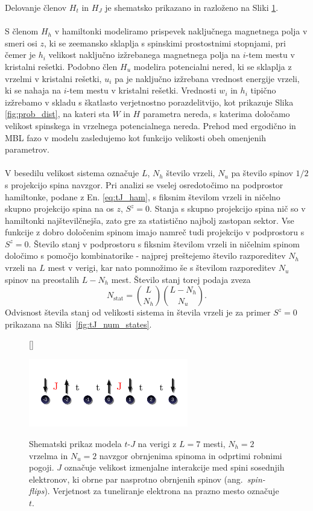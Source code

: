 Delovanje členov $H_t$ in $H_J$ je shematsko prikazano in razloženo na Sliki \ref{fig:tJ_scheme}. \\\\
S členom $H_h$ v hamiltonki modeliramo prispevek naključnega magnetnega polja v smeri osi $z$, ki se zeemansko sklaplja s 
spinskimi prostostnimi stopnjami, pri čemer je $h_i$ velikost naključno izžrebanega magnetnega polja na $i$-tem mestu v kristalni rešetki. Podobno člen $H_u$ modelira potencialni nered, ki se sklaplja z vrzelmi v kristalni rešetki, $u_i$ pa je naključno izžrebana vrednost energije vrzeli, ki se nahaja na $i$-tem mestu v kristalni rešetki. Vrednosti $w_i$ in $h_i$ tipično izžrebamo v skladu s škatlasto verjetnostno porazdelitvijo, kot prikazuje Slika \ref{fig:prob_dist}, na kateri sta $W$ in $H$	 parametra 
nereda, s katerima določamo velikost spinskega in vrzelnega potencialnega nereda. Prehod med ergodično in MBL fazo
v modelu zasledujemo kot funkcijo velikosti obeh omenjenih parametrov.\\\\
V besedilu velikost sistema označuje $L$, $N_h$ število vrzeli, $N_u$ pa število spinov $1/2$ s projekcijo spina navzgor. Pri analizi se vselej osredotočimo na podprostor hamiltonke, podane z En. \eqref{eq:tJ_ham}, s fiksnim številom vrzeli in ničelno skupno projekcijo spina na os $z$, $S^z=0$. Stanja s skupno projekcijo spina nič so v hamiltonki najštevilčnejša, zato gre za statistično najbolj zastopan sektor. Vse funkcije z dobro določenim spinom imajo namreč tudi projekcijo v podprostoru s $S^z=0$. Število stanj v podprostoru s fiksnim številom vrzeli in ničelnim spinom določimo s pomočjo kombinatorike - najprej prešteje{}mo število razporeditev $N_h$ vrzeli na $L$ mest v verigi, kar nato pomnožimo še s številom razporeditev $N_u$ spinov na preostalih $L-N_h$ mest. Število stanj torej podaja zveza
\begin{equation}\label{eq:nstat}
N_\mathrm{stat}=\binom{L}{N_h}\binom{L-N_h}{N_u}.
\end{equation}
Odvisnost števila stanj od velikosti sistema in števila vrzeli je za primer $S^z=0$ prikazana na Sliki~\ref{fig:tJ_num_states}.
\newpage
\begin{figure}[H]
[\FBwidth]
{\caption{Shematski prikaz modela $t$-$J$ na verigi z $L=7$ mesti, $N_h=2$ vrzelma in $N_u=2$ navzgor obrnjenima spinoma in odprtimi robnimi pogoji.	 $J$ označuje velikost izmenjalne interakcije med spini sosednjih elektronov, ki obrne par nasprotno obrnjenih spinov (ang.~\emph{spin-flips}). Verjetnost za tuneliranje elektrona na prazno mesto označuje $t$. }\label{fig:tJ_scheme}}
{\includegraphics[width=0.62\textwidth]{tJ_scheme.pdf}}
\end{figure}
